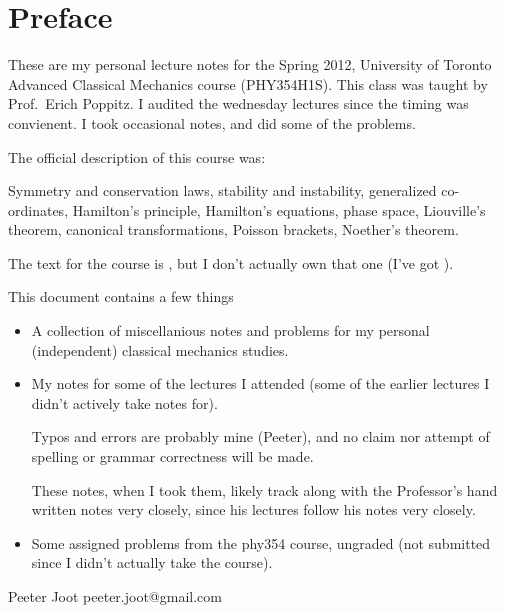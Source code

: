 \chapter*{Preface}\normalsize

These are my personal lecture notes for the Spring 2012, University of Toronto Advanced Classical Mechanics course (PHY354H1S).  This class was taught by Prof.\ Erich Poppitz.  I audited the wednesday lectures since the timing was convienent.  I took occasional notes, and did some of the problems.

The official description of this course was:

Symmetry and conservation laws, stability and instability, generalized co-ordinates, Hamilton's principle, Hamilton's equations, phase space, Liouville's theorem, canonical transformations, Poisson brackets, Noether's theorem.

The text for the course is \citep{landau1960classical}, but I don't actually own that one (I've got \cite{goldstein1951cm}).

This document contains a few things

\begin{itemize}
\item A collection of miscellanious notes and problems for my personal (independent) classical mechanics studies.

\item My notes for some of the lectures I attended (some of the earlier lectures I didn't actively take notes for).

Typos and errors are probably mine (Peeter), and no claim nor attempt of spelling or grammar correctness will be made.  

These notes, when I took them, likely track along with the Professor's hand written notes very closely, since his lectures follow his notes very closely.

\item Some assigned problems from the phy354 course, ungraded (not submitted since I didn't actually take the course).

\end{itemize}

Peeter Joot  \quad peeter.joot@gmail.com 
